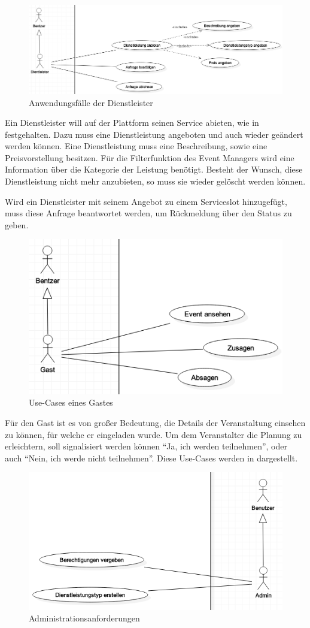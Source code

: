 \begin{figure}[h]
\centering
\includegraphics[width=\textwidth]{res/images/UseCaseServiceProvider.png}
\caption{Anwendungsfälle der Dienstleister}
\label{uc3}
\end{figure}

Ein Dienstleister will auf der Plattform seinen Service abieten, wie in  festgehalten. Dazu muss eine Dienstleistung angeboten und auch wieder geändert werden können. Eine Dienstleistung muss eine Beschreibung, sowie eine Preisvorstellung besitzen. Für die Filterfunktion des Event Managers wird eine Information über die Kategorie der Leistung benötigt. Besteht der Wunsch, diese Dienstleistung nicht mehr anzubieten, so muss sie wieder gelöscht werden können.

Wird ein Dienstleister mit seinem Angebot zu einem Serviceslot hinzugefügt, muss diese Anfrage beantwortet werden, um Rückmeldung über den Status zu geben.

\begin{figure}[h]
\centering
\includegraphics[width=.5\textwidth]{res/images/UseCaseGuest.png}
\caption{Use-Cases eines Gastes}
\label{uc4}
\end{figure}

Für den Gast ist es von großer Bedeutung, die Details der Veranstaltung einsehen zu können, für welche er eingeladen wurde. Um dem Veranstalter die Planung zu erleichtern, soll signalisiert werden können \enquote{Ja, ich werden teilnehmen}, oder auch \enquote{Nein, ich werde nicht teilnehmen}. Diese Use-Cases werden in  dargestellt. \newpage

\begin{figure}[h]
\centering
\includegraphics[width=.7\textwidth]{res/images/UseCaseAdmin.png}
\caption{Administrationsanforderungen}
\label{uc5}
\end{figure}

